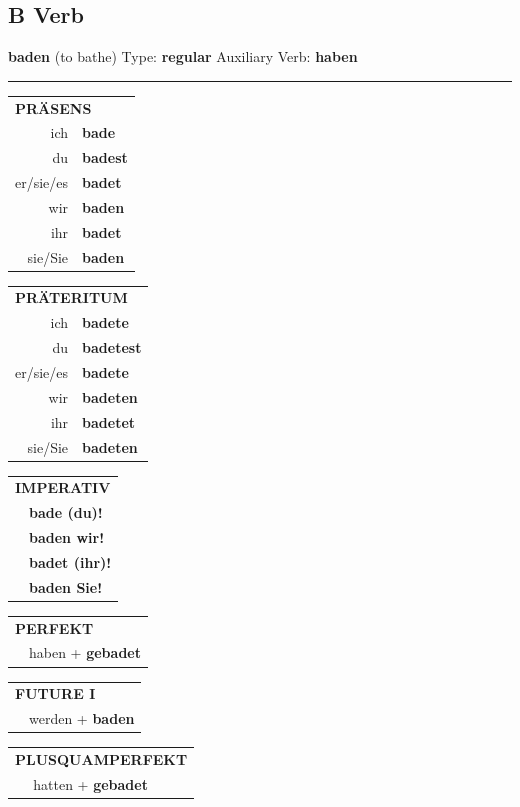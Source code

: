 \documentclass[10pt,a4paper]{revtex4-2}
\begin{document}
\subsection{B Verb}
\begin{verbbox}
{\Large \bf baden} (to bathe) \hfill Type: \textbf{regular} \hfill Auxiliary Verb: \textbf{haben}

\vspace{5pt}
\hrule
\vspace{5pt}

\begin{tabular}{rl}
\multicolumn{2}{l}{\textbf{PRÄSENS}}\\
ich & \textbf{bade}\\
du & \textbf{badest}\\
er/sie/es & \textbf{badet}\\
wir & \textbf{baden}\\
ihr & \textbf{badet}\\
sie/Sie & \textbf{baden}\\
\end{tabular}
\hfill
\begin{tabular}{rl}
\multicolumn{2}{l}{\textbf{PRÄTERITUM}}\\
ich & \textbf{badete}\\
du & \textbf{badetest}\\
er/sie/es & \textbf{badete}\\
wir & \textbf{badeten}\\
ihr & \textbf{badetet}\\
sie/Sie & \textbf{badeten}\\
\end{tabular}
\hfill
\begin{tabular}{rl}
\multicolumn{2}{l}{\textbf{IMPERATIV}}\\
& \textbf{bade (du)!}\\
& \textbf{baden wir!}\\
& \textbf{badet (ihr)!}\\
& \textbf{baden Sie!}\\
\end{tabular}

\vspace{10pt}

\begin{tabular}{rl}
\multicolumn{2}{l}{\textbf{PERFEKT}}\\
& haben + \textbf{gebadet}\\
\end{tabular}
\hfill
\begin{tabular}{rl}
\multicolumn{2}{l}{\textbf{FUTURE I}}\\
& werden + \textbf{baden}\\
\end{tabular}
\hfill
\begin{tabular}{rl}
\multicolumn{2}{l}{\textbf{PLUSQUAMPERFEKT}}\\
& hatten + \textbf{gebadet}\\
\end{tabular}


\end{verbbox}
\end{document}
